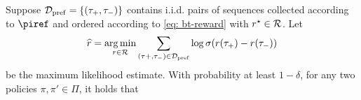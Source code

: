 \documentclass{article}
\newcommand{\arxiv}[1]{\iftoggle{icml}{}{#1}}
\newcommand{\icml}[1]{\iftoggle{icml}{#1}{}}
\begin{document}
\begin{theorem}\label{thm: preference}
    Suppose $\mathcal{D}_{\mathrm{pref}} = \{(\tau_+, \tau_-)\}$ contains i.i.d. pairs of sequences collected according to $\piref$ and ordered according to \cref{eq: bt-reward} with $r^\star\in\mathcal{R}$.
    Let $$\widehat{r} = \mathop{\arg\min}_{r\in \mathcal{R}} \sum_{(\tau+,\tau_-)\in \mathcal{D}_{\mathrm{pref}}} \log \sigma(r(\tau_+) - r(\tau_-))$$
    be the maximum likelihood estimate.
    With probability at least $1 - \delta$, for any two policies $\pi,\pi'\in\Pi$, 
    it holds that
    \arxiv{
    \begin{equation}\label{eq: thm-preference}
        \EE_{\tau\sim \pi, \tau'\sim \pi'}[|r^\star(\tau) - r^\star(\tau') - \hr(\tau) + \hr(\tau')|]\lesssim H^{3/2}\rmax e^{2\rmax}\cdot \sqrt{\frac{(\Cs(\pi, \piref)\vee \Cs(\pi', \piref))\log(|\Pi|/\delta)}{|\calD|}}.
    \end{equation}
    }
    \icml{
    \begin{align*}
        &\hspace{-0.5cm}\EE_{\tau\sim \pi, \tau'\sim \pi'}[|r^\star(\tau) - r^\star(\tau') - \hr(\tau) + \hr(\tau')|]\\
        & \lesssim H^{3/2}\rmax e^{2\rmax}\\
        &\quad\cdot \sqrt{\frac{(\Cs(\pi, \piref)\vee \Cs(\pi', \piref))\log(|\Pi|/\delta)}{|\calD|}}.\numberthis\label{eq: thm-preference}
    \end{align*}
    }
\end{theorem}
\end{document}
